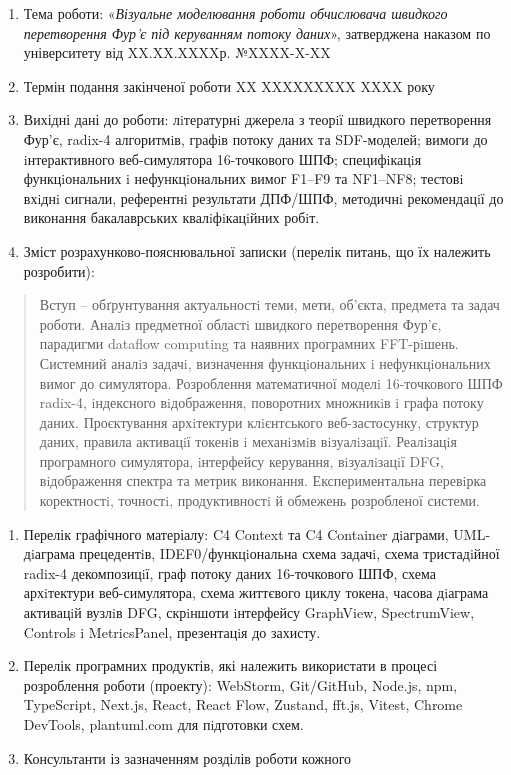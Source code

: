 \documentclass[
]{article}
\begin{document}
\begin{enumerate}
\def\labelenumi{\arabic{enumi}.}
\item
  Тема роботи: «\emph{Візуальне моделювання роботи обчислювача швидкого
  перетворення Фур'є під керуванням потоку даних}», затверджена наказом
  по університету від XX.XX.XXXXр. №XXXX-X-XX
\item
  Термін подання закінченої роботи XX XXXXXXXXX XXXX року
\item
  Вихідні дані до роботи: лiтературнi джерела з теорiї швидкого
  перетворення Фур'є, radix-4 алгоритмiв, графiв потоку даних та
  SDF-моделей; вимоги до iнтерактивного веб-симулятора 16-точкового ШПФ;
  специфiкацiя функцiональних i нефункцiональних вимог F1--F9 та
  NF1--NF8; тестовi вхiднi сигнали, референтнi результати ДПФ/ШПФ,
  методичнi рекомендацiї до виконання бакалаврських квалiфiкацiйних
  робiт.
\item
  Зміст розрахунково-пояснювальної записки (перелік питань, що їх
  належить розробити):
\end{enumerate}

\begin{quote}
Вступ -- обґрунтування актуальностi теми, мети, об'єкта, предмета та
задач роботи. Аналiз предметної областi швидкого перетворення Фур'є,
парадигми dataflow computing та наявних програмних FFT-рiшень. Системний
аналiз задачi, визначення функцiональних i нефункцiональних вимог до
симулятора. Розроблення математичної моделi 16-точкового ШПФ radix-4,
iндексного вiдображення, поворотних множникiв i графа потоку даних.
Проєктування архiтектури клiєнтського веб-застосунку, структур даних,
правила активацiї токенiв i механiзмiв вiзуалiзацiї. Реалiзацiя
програмного симулятора, iнтерфейсу керування, вiзуалiзацiї DFG,
вiдображення спектра та метрик виконання. Експериментальна перевiрка
коректностi, точностi, продуктивностi й обмежень розробленої системи.
\end{quote}

\begin{enumerate}
\def\labelenumi{\arabic{enumi}.}
\setcounter{enumi}{4}
\item
  Перелік графічного матеріалу: C4 Context та C4 Container дiаграми,
  UML-дiаграма прецедентiв, IDEF0/функцiональна схема задачi, схема
  тристадiйної radix-4 декомпозицiї, граф потоку даних 16-точкового ШПФ,
  схема архiтектури веб-симулятора, схема життєвого циклу токена, часова
  дiаграма активацiй вузлiв DFG, скрiншоти iнтерфейсу GraphView,
  SpectrumView, Controls i MetricsPanel, презентацiя до захисту.
\item
  Перелік програмних продуктів, які належить використати в процесі
  розроблення роботи (проекту): WebStorm, Git/GitHub, Node.js, npm,
  TypeScript, Next.js, React, React Flow, Zustand, fft.js, Vitest,
  Chrome DevTools, plantuml.com для пiдготовки схем.
\item
  Консультанти із зазначенням розділів роботи кожного
\end{enumerate}
\end{document}
